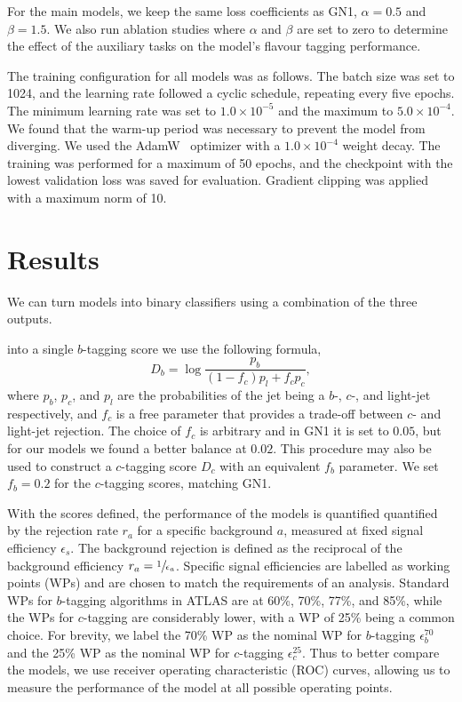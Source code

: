 For the main models, we keep the same loss coefficients as GN1, $\alpha = 0.5$ and $\beta = 1.5$.
We also run ablation studies where $\alpha$ and $\beta$ are set to zero to determine the effect of the auxiliary tasks on the model's flavour tagging performance.

The training configuration for all models was as follows.
The batch size was set to 1024, and the learning rate followed a cyclic schedule, repeating every five epochs.
The minimum learning rate was set to $1.0 \times 10^{-5}$ and the maximum to $5.0 \times 10^{-4}$.
We found that the warm-up period was necessary to prevent the model from diverging.
We used the AdamW~\cite{AdamW} optimizer with a $1.0 \times 10^{-4}$ weight decay.
The training was performed for a maximum of 50 epochs, and the checkpoint with the lowest validation loss was saved for evaluation.
Gradient clipping was applied with a maximum norm of 10.

\section{Results}

We can turn models into binary classifiers using a combination of the three outputs.

into a single $b$-tagging score we use the following formula,
\begin{equation}
    D_b = \log\frac{p_b}{(1-f_c)p_l + f_c p_c},
\end{equation}
where $p_b$, $p_c$, and $p_l$ are the probabilities of the jet being a $b$-, $c$-, and light-jet respectively, and $f_c$ is a free parameter that provides a trade-off between $c$- and light-jet rejection.
The choice of $f_c$ is arbitrary and in GN1 it is set to $0.05$, but for our models we found a better balance at $0.02$.
This procedure may also be used to construct a $c$-tagging score $D_c$ with an equivalent $f_b$ parameter.
We set $f_b = 0.2$ for the $c$-tagging scores, matching GN1.

\newcommand{\bnom}{\epsilon_b^{70}}
\newcommand{\cnom}{\epsilon_c^{25}}
With the scores defined, the performance of the models is quantified quantified by the rejection rate $r_a$ for a specific background $a$, measured at fixed signal efficiency $\epsilon_s$.
The background rejection is defined as the reciprocal of the background efficiency $r_a = \sfrac{1}{\epsilon_a}$.
Specific signal efficiencies are labelled as working points (WPs) and are chosen to match the requirements of an analysis.
Standard WPs for $b$-tagging algorithms in ATLAS are at 60\%, 70\%, 77\%, and 85\%, while the WPs for $c$-tagging are considerably lower, with a WP of 25\% being a common choice.
For brevity, we label the 70\% WP as the nominal WP for $b$-tagging $\bnom$ and the 25\% WP as the nominal WP for $c$-tagging $\cnom$.
Thus to better compare the models, we use receiver operating characteristic (ROC) curves, allowing us to measure the performance of the model at all possible operating points.


